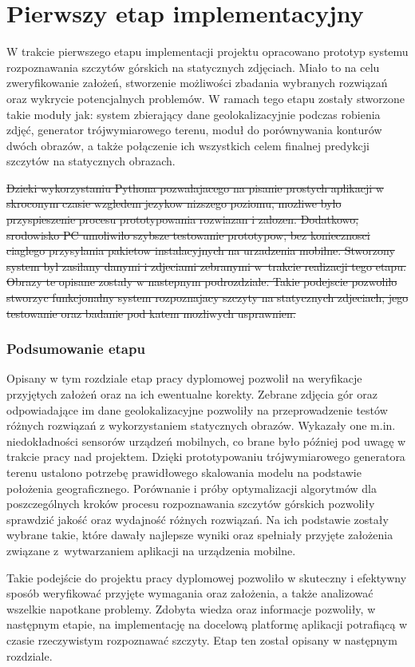 \newpage

\section{Pierwszy etap implementacyjny} \label{sec:pierwszy_etap}

W trakcie pierwszego etapu implementacji projektu opracowano prototyp systemu rozpoznawania szczytów górskich na statycznych zdjęciach. Miało to na celu zweryfikowanie założeń, stworzenie możliwości zbadania wybranych rozwiązań oraz wykrycie potencjalnych problemów. W ramach tego etapu zostały stworzone takie moduły jak: system zbierający dane geolokalizacyjnie podczas robienia zdjęć, generator trójwymiarowego terenu, moduł do porównywania konturów dwóch obrazów, a także połączenie ich wszystkich celem finalnej predykcji szczytów na statycznych obrazach.

\st{Dzieki wykorzystaniu Pythona pozwalajacego na pisanie prostych aplikacji w skroconym czasie wzgledem jezykow nizszego poziomu, mozliwe bylo przyspieszenie procesu prototypowania rozwiazan i zalozen. Dodatkowo, srodowisko PC umoliwilo szybsze testowanie prototypow, bez koniecznosci ciaglego przysylania pakietow instalacyjnych na urzadzenia mobilne. Stworzony system byl zasilany danymi i zdjeciami zebranymi w~trakcie realizacji tego etapu. Obrazy te opisane zostaly w nastepnym podrozdziale. Takie podejscie pozwolilo stworzyc funkcjonalny system rozpoznajacy szczyty na statycznych zdjeciach, jego testowanie oraz badanie pod katem mozliwych usprawnien.}



\subsubsection{Podsumowanie etapu}

Opisany w tym rozdziale etap pracy dyplomowej pozwolił na weryfikacje przyjętych założeń oraz na ich ewentualne korekty. Zebrane zdjęcia gór oraz odpowiadające im dane geolokalizacyjne pozwoliły na przeprowadzenie testów różnych rozwiązań z wykorzystaniem statycznych obrazów. Wykazały one m.in. niedokładności sensorów urządzeń mobilnych, co brane było później pod uwagę w trakcie pracy nad projektem. Dzięki prototypowaniu trójwymiarowego generatora terenu ustalono potrzebę prawidłowego skalowania modelu na podstawie położenia geograficznego. Porównanie i próby optymalizacji algorytmów dla poszczególnych kroków procesu rozpoznawania szczytów górskich pozwoliły sprawdzić jakość oraz wydajność różnych rozwiązań. Na ich podstawie zostały wybrane takie, które dawały najlepsze wyniki oraz spełniały przyjęte założenia związane z~wytwarzaniem aplikacji na urządzenia mobilne. 

Takie podejście do projektu pracy dyplomowej pozwoliło w skuteczny i efektywny sposób weryfikować przyjęte wymagania oraz założenia, a także analizować wszelkie napotkane problemy. Zdobyta wiedza oraz informacje pozwoliły, w następnym etapie, na implementację na docelową platformę aplikacji potrafiącą w czasie rzeczywistym rozpoznawać szczyty. Etap ten został opisany w następnym rozdziale.